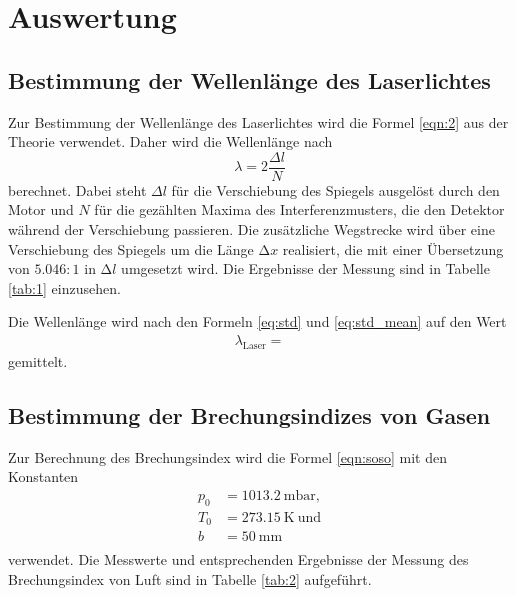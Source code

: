 \section{Auswertung}
\label{sec:Auswertung}

\subsection{Bestimmung der Wellenlänge des Laserlichtes}

Zur Bestimmung der Wellenlänge des Laserlichtes wird die Formel \eqref{eqn:2} aus der Theorie verwendet.
Daher wird die Wellenlänge nach
\begin{equation}
  \lambda = 2\frac{\Delta l}{N}
\end{equation}
berechnet.
Dabei steht $\Delta l$ für die Verschiebung des Spiegels ausgelöst durch den Motor und $N$ für die gezählten Maxima des Interferenzmusters, die den Detektor während der Verschiebung passieren.
Die zusätzliche Wegstrecke wird über eine Verschiebung des Spiegels um die Länge $\increment{x}$ realisiert, die mit einer Übersetzung von $5.046:1$ in $\increment{l}$ umgesetzt wird.
Die Ergebnisse der Messung sind in Tabelle \ref{tab:1} einzusehen.



Die Wellenlänge wird nach den Formeln \eqref{eq:std} und \eqref{eq:std_mean} auf den Wert
\begin{align*}
  \lambda_{\text{Laser}} = 
\end{align*}
gemittelt.

\subsection{Bestimmung der Brechungsindizes von Gasen}

Zur Berechnung des Brechungsindex wird die Formel \eqref{eqn:soso} mit den Konstanten
\begin{align*}
  p_0 &= \SI{1013,2}{\milli\bar},\\
  T_0 &= \SI{273,15}{\kelvin} \: \text{und}\\
  b   &= \SI{50}{\milli\metre}\\
\end{align*}
verwendet.
Die Messwerte und entsprechenden Ergebnisse der Messung des Brechungsindex von Luft sind in Tabelle \ref{tab:2} aufgeführt.

